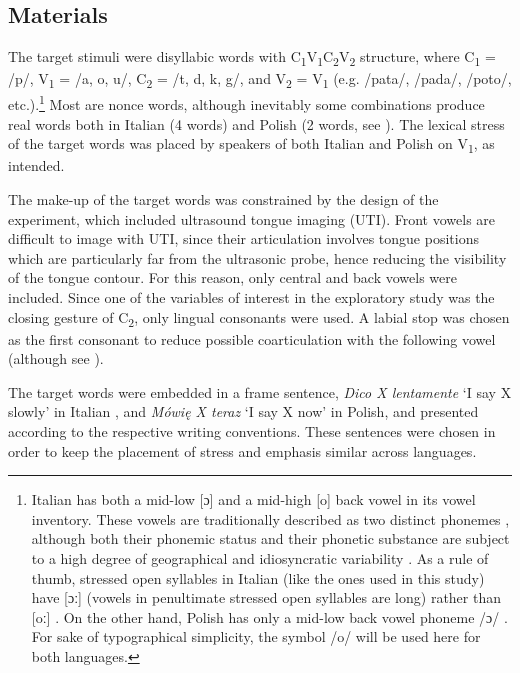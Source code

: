 \documentclass[preprint]{JASAnew}
\begin{document}
\hypertarget{materials}{%
\subsection{Materials}\label{materials}}

\label{s:materials}

The target stimuli were disyllabic words with
C\textsubscript{1}V\textsubscript{1}C\textsubscript{2}V\textsubscript{2}
structure, where C\textsubscript{1} = /p/, V\textsubscript{1} = /a, o,
u/, C\textsubscript{2} = /t, d, k, g/, and V\textsubscript{2} =
V\textsubscript{1} (e.g. /pata/, /pada/, /poto/,
etc.).\footnote{Italian has both a mid-low [ɔ] and a mid-high [o] back vowel in its vowel inventory. These vowels are traditionally described as two distinct phonemes \citep{renwick2016}, although both their phonemic status and their phonetic substance are subject to a high degree of geographical and idiosyncratic variability \citet{renwick2016}. As a rule of thumb, stressed open syllables in Italian (like the ones used in this study) have [ɔː] (vowels in penultimate stressed open syllables are long) rather than [oː] \citet{renwick2016}. On the other hand, Polish has only a mid-low back vowel phoneme /ɔ/ \citep{gussmann2007}. For sake of typographical simplicity, the symbol /o/ will be used here for both languages.}
Most are nonce words, although inevitably some combinations produce real
words both in Italian (4 words) and Polish (2 words, see
). The lexical stress of the target words was placed by
speakers of both Italian and Polish on V\textsubscript{1}, as intended.

The make-up of the target words was constrained by the design of the
experiment, which included ultrasound tongue imaging (UTI). Front vowels
are difficult to image with UTI, since their articulation involves
tongue positions which are particularly far from the ultrasonic probe,
hence reducing the visibility of the tongue contour. For this reason,
only central and back vowels were included. Since one of the variables
of interest in the exploratory study was the closing gesture of
C\textsubscript{2}, only lingual consonants were used. A labial stop was
chosen as the first consonant to reduce possible coarticulation with the
following vowel (although see \citealt{vazquez-alvarez2007}).

The target words were embedded in a frame sentence, \emph{Dico X
lentamente} `I say X slowly' in Italian \citep[following][]{hajek2008},
and \emph{Mówię X teraz} `I say X now' in Polish, and presented
according to the respective writing conventions. These sentences were
chosen in order to keep the placement of stress and emphasis similar
across languages.
\end{document}
